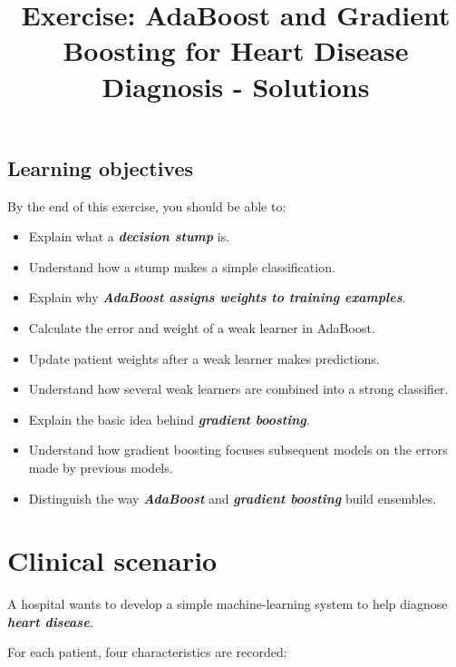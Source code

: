 \documentclass[10pt]{article}
\begin{document}
\title{Exercise: AdaBoost and Gradient Boosting for Heart Disease Diagnosis - Solutions}
\author{}
\date{}
\maketitle
\subsection*{Learning objectives}
By the end of this exercise, you should be able to:

\begin{itemize}
\item
Explain what a \textbf{\textit{decision stump}} is.

\item
Understand how a stump makes a simple classification.

\item
Explain why \textbf{\textit{AdaBoost assigns weights to training examples}}.

\item
Calculate the error and weight of a weak learner in AdaBoost.

\item
Update patient weights after a weak learner makes predictions.

\item
Understand how several weak learners are combined into a strong classifier.

\item
Explain the basic idea behind \textbf{\textit{gradient boosting}}.

\item
Understand how gradient boosting focuses subsequent models on the errors made by previous models.

\item
Distinguish the way \textbf{\textit{AdaBoost}} and \textbf{\textit{gradient boosting}} build ensembles.

\end{itemize}
\section*{Clinical scenario}
A hospital wants to develop a simple machine-learning system to help diagnose \textbf{\textit{heart disease}}.

For each patient, four characteristics are recorded:
\end{document}
